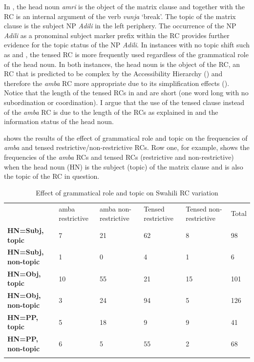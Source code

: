 \documentclass[output=paper,colorlinks,citecolor=brown]{langscibook}
\begin{document}

In , the head noun \textit{amri} is the object of the matrix clause and together with the RC is an internal argument of the verb \textit{vunja} ‘break’. The topic of the matrix clause is the subject NP \textit{Adili} in the left periphery. The occurrence of the NP \textit{Adili} as a pronominal subject marker prefix within the RC provides further evidence for the topic status of the NP \textit{Adili}. In instances with no topic shift such as  and , the tensed RC is more frequently used regardless of the grammatical role of the head noun. In both instances, the head noun is the object of the RC, an RC that is predicted to be complex by the Accessibility Hierarchy (\citealt{KeenanComrie1977}) and therefore the \textit{amba} RC more appropriate due to its simplification effects (\citealt{Ashton1944, Schadeberg1989}). Notice that the length of the tensed RCs in  and  are short (one word long with no subordination or coordination). I argue that the use of the tensed clause instead of the \textit{amba} RC is due to the length of the RCs as explained in  and the information status of the head noun.

 shows the results of the effect of grammatical role and topic on the frequencies of \textit{amba} and tensed restrictive/non-restrictive RCs. Row one, for example, shows the frequencies of the \textit{amba} RCs and tensed RCs (restrictive and non-restrictive) when the head noun (HN) is the subject (topic) of the matrix clause and is also the topic of the RC in question.

\begin{table}
    \begin{tabularx}{\textwidth}{XXXXXX}
        & amba restrictive & amba non-restrictive & Tensed restrictive & Tensed non-restrictive & Total\\
        \lsptoprule
        \textbf{HN=Subj,} \textbf{topic} & 7 & 21 & 62 & 8 & 98\\
        \textbf{HN=Subj,} \textbf{non-topic} & 1 & 0 & 4 & 1 & 6\\
        \textbf{HN=Obj,} \textbf{topic} & 10 & 55 & 21 & 15 & 101\\
        \textbf{HN=Obj,} \textbf{non-topic} & 3 & 24 & 94 & 5 & 126\\
        \textbf{HN=PP,} \textbf{topic} & 5 & 18 & 9 & 9 & 41\\
        \textbf{HN=PP,} \textbf{non-topic} & 6 & 5 & 55 & 2 & 68\\
        \lspbottomrule
    \end{tabularx}
    \caption{Effect of grammatical role and topic on Swahili RC variation}
    \label{tab:mwamzandi:2}
\end{table}
\end{document}
